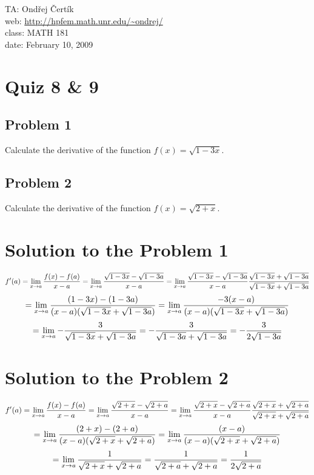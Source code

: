 \documentclass[10pt]{article}
\begin{document}
\noindent TA: Ondřej Čertík\\
web: \url{http://hpfem.math.unr.edu/~ondrej/}\\
class: MATH 181\\
date: February 10, 2009

\section*{Quiz 8 \& 9}

\subsection*{Problem 1}

Calculate the derivative of the function $f(x) = \sqrt{1-3x}$.

\subsection*{Problem 2}

Calculate the derivative of the function $f(x) = \sqrt{2+x}$.

\section*{Solution to the Problem 1}

$$f'(a)
= \lim_{x\to a}{f(x)-f(a)\over x-a}
= \lim_{x\to a}{\sqrt{1-3x}-\sqrt{1-3a}\over x-a}
= \lim_{x\to a}{\sqrt{1-3x}-\sqrt{1-3a}\over x-a}
    {\sqrt{1-3x}+\sqrt{1-3a}\over\sqrt{1-3x}+\sqrt{1-3a}}
$$
$$
= \lim_{x\to a}{(1-3x)-(1-3a)\over (x-a)(\sqrt{1-3x}+\sqrt{1-3a})}
= \lim_{x\to a}{-3(x-a)\over (x-a)(\sqrt{1-3x}+\sqrt{1-3a})}
$$
$$
= \lim_{x\to a}-{3\over\sqrt{1-3x}+\sqrt{1-3a}}
= -{3\over\sqrt{1-3a}+\sqrt{1-3a}}
= -{3\over2\sqrt{1-3a}}
$$

\section*{Solution to the Problem 2}

$$f'(a)
= \lim_{x\to a}{f(x)-f(a)\over x-a}
= \lim_{x\to a}{\sqrt{2+x}-\sqrt{2+a}\over x-a}
= \lim_{x\to a}{\sqrt{2+x}-\sqrt{2+a}\over x-a}
    {\sqrt{2+x}+\sqrt{2+a}\over\sqrt{2+x}+\sqrt{2+a}}
$$
$$
= \lim_{x\to a}{(2+x)-(2+a)\over (x-a)(\sqrt{2+x}+\sqrt{2+a})}
= \lim_{x\to a}{(x-a)\over (x-a)(\sqrt{2+x}+\sqrt{2+a})}
$$
$$
= \lim_{x\to a}{1\over\sqrt{2+x}+\sqrt{2+a}}
= {1\over\sqrt{2+a}+\sqrt{2+a}}
= {1\over2\sqrt{2+a}}
$$
\end{document}
